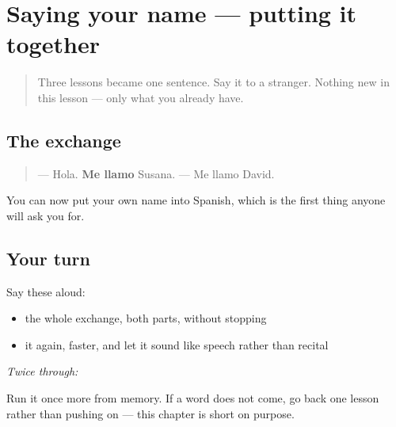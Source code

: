 \section[Practice]{Saying your name — putting it together}

\label{lesson:ES-C03-repaso-nombre}



\begin{quote}
Three lessons became one sentence. Say it to a stranger. Nothing new in this lesson — only what you already have.
\end{quote}

\subsection*{The exchange}
\begin{quote}
— Hola. \textbf{Me llamo} Susana. — Me llamo David.
\end{quote}

\begin{grammarlens}[title={What you've built}]
You can now put your own name into Spanish, which is the first thing anyone will ask you for.
\end{grammarlens}

\subsection*{Your turn}
Say these aloud:

\begin{itemize}
\raggedright
  \item the whole exchange, both parts, without stopping
  \item it again, faster, and let it sound like speech rather than recital
\end{itemize}

\emph{Twice through:}

\begin{tcolorbox}[breakable,colback=teal!4,colframe=teal!35!black,title={Before you move on}]
Run it once more from memory. If a word does not come, go back one lesson rather than pushing on — this chapter is short on purpose.
\end{tcolorbox}
